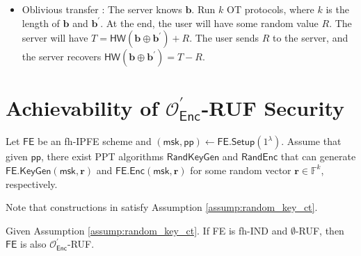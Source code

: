 \begin{itemize}
	\item Oblivious transfer \cite{cryptoeprint:2012/586}: The server knows $\mathbf{b}$. Run $k$ OT protocols, where $k$ is the length of $\mathbf{b}$ and $\mathbf{b}^\prime$. At the end, the user will have some random value $R$. The server will have $T = \textsf{HW}(\mathbf{b} \oplus \mathbf{b}^\prime) + R$. The user sends $R$ to the server, and the server recovers $\textsf{HW}(\mathbf{b} \oplus \mathbf{b}^\prime) = T - R$.

\end{itemize}


\newpage


\iffalse

\section{Achievability of $\mathcal{O}^\prime_{\textsf{Enc}}$-RUF Security}

\begin{assumption}
\label{assump:random_key_ct}

Let $\textsf{FE}$ be an fh-IPFE scheme and $(\textsf{msk}, \textsf{pp}) \gets \textsf{FE.Setup}(1^\lambda)$. Assume that given $\textsf{pp}$, there exist PPT algorithms $\textsf{RandKeyGen}$ and $\textsf{RandEnc}$ that can generate $\textsf{FE.KeyGen}(\textsf{msk}, \mathbf{r})$ and $\textsf{FE.Enc}(\textsf{msk}, \mathbf{r})$ for some random vector $\mathbf{r} \in \mathbb{F}^k$, respectively.

\end{assumption}

Note that constructions in \cite{10.1007/978-3-319-45871-7_24, cryptoeprint:2016/440} satisfy Assumption \ref{assump:random_key_ct}.

\begin{theorem}
\label{thm:fh-IPFE:ind-OEnc-ruf}
Given Assumption \ref{assump:random_key_ct}. If \textsf{FE} is fh-IND and $\emptyset$-RUF, then $\textsf{FE}$ is also $\mathcal{O}^\prime_{\textsf{Enc}}$-RUF.

\end{theorem}

